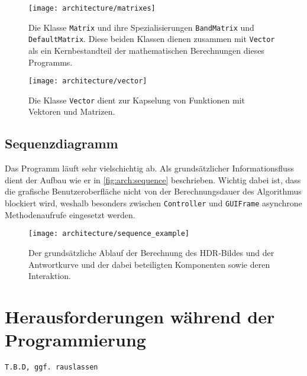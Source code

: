 \begin{figure}
  \begin{center}
    \texttt{[image: architecture/matrixes]}
    \caption{Die Klasse \texttt{Matrix} und ihre Spezialisierungen \texttt{BandMatrix} und \texttt{DefaultMatrix}. Diese beiden Klassen dienen zusammen mit \texttt{Vector} als ein Kernbestandteil der mathematischen Berechnungen dieses Programms.}
    \label{fig:arch:matrix}
  \end{center}
\end{figure}


\begin{figure}
  \begin{center}
    \texttt{[image: architecture/vector]}
    \caption{Die Klasse \texttt{Vector} dient zur Kapselung von Funktionen mit Vektoren und Matrizen.}
    \label{fig:arch:vector}
  \end{center}
\end{figure}


\subsection{Sequenzdiagramm}
Das Programm läuft sehr vielschichtig ab. Als grundsätzlicher Informationsfluss dient der Aufbau wie er in \autoref{fig:arch:sequence} beschrieben. Wichtig dabei ist, dass die grafische Benutzeroberfläche nicht von der Berechnungsdauer des Algorithmus blockiert wird, weshalb besonders zwischen \texttt{Controller} und \texttt{GUIFrame} asynchrone Methodenaufrufe eingesetzt werden.
\begin{figure}
  \begin{center}
    \texttt{[image: architecture/sequence\_example]}
    \caption{Der grundsätzliche Ablauf der Berechnung des HDR-Bildes und der Antwortkurve und der dabei beteiligten Komponenten sowie deren Interaktion. }
    \label{fig:arch:sequence}
  \end{center}
\end{figure}



\section{Herausforderungen während der Programmierung}

\texttt{T.B.D, ggf. rauslassen}